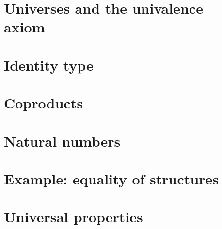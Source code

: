 \section{Universes and the univalence axiom}
\label{sec:compute-universe}


\section{Identity type}
\label{sec:compute-paths}


\section{Coproducts}
\label{sec:compute-coprod}


\section{Natural numbers}
\label{sec:compute-nat}


\section{Example: equality of structures}
\label{sec:equality-of-structures}


\section{Universal properties}
\label{sec:universal-properties}






